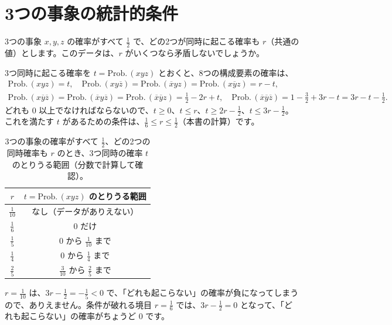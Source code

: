 \documentclass[a4paper,11pt,openany]{ltjsbook}
\newcommand{\nx}[1]{\overline{#1}}
\newcommand{\Prob}{\mathrm{Prob.}\,}
\begin{document}
\section{3つの事象の統計的条件}

3つの事象 $x,y,z$ の確率がすべて $\tfrac12$ で、どの2つが同時に起こる確率も $r$（共通の値）とします。このデータは、$r$ がいくつなら矛盾しないでしょうか。

3つ同時に起こる確率を $t=\Prob(xyz)$ とおくと、8つの構成要素の確率は、
\begin{gather*}
\Prob(xyz)=t,\quad\Prob(xy\nx z)=\Prob(\nx xyz)=\Prob(x\nx yz)=r-t,\\
\Prob(x\nx y\nx z)=\Prob(\nx xy\nx z)=\Prob(\nx x\nx yz)=\tfrac12-2r+t,\quad\Prob(\nx x\nx y\nx z)=1-\tfrac32+3r-t=3r-t-\tfrac12 .
\end{gather*}
どれも $0$ 以上でなければならないので、$t\ge0$、$t\le r$、$t\ge2r-\tfrac12$、$t\le3r-\tfrac12$。これを満たす $t$ があるための条件は、$\tfrac16\le r\le\tfrac12$（本書の計算）です。

\begin{table}[htbp]
\centering
\begin{tabular}{c|c}
\toprule
$r$ & $t=\Prob(xyz)$ のとりうる範囲\\
\midrule
$\tfrac1{10}$ & なし（データがありえない）\\
$\tfrac16$ & $0$ だけ\\
$\tfrac15$ & $0$ から $\tfrac1{10}$ まで\\
$\tfrac14$ & $0$ から $\tfrac14$ まで\\
$\tfrac25$ & $\tfrac3{10}$ から $\tfrac25$ まで\\
\bottomrule
\end{tabular}
\caption{3つの事象の確率がすべて $\tfrac12$、どの2つの同時確率も $r$ のとき、3つ同時の確率 $t$ のとりうる範囲（分数で計算して確認）。}
\end{table}

$r=\tfrac1{10}$ は、$3r-\tfrac12=-\tfrac15<0$ で、「どれも起こらない」の確率が負になってしまうので、ありえません。条件が破れる境目 $r=\tfrac16$ では、$3r-\tfrac12=0$ となって、「どれも起こらない」の確率がちょうど $0$ です。
\end{document}
